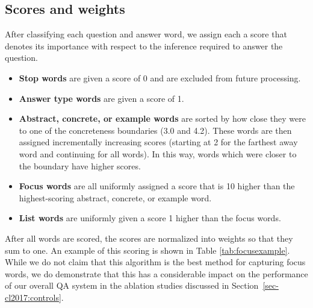 \subsection{Scores and weights}

After classifying each question and answer word, we assign each a score that denotes its importance with respect to the inference required to answer the question.  
\begin{itemize}

\item \textbf{Stop words} are given a score of 0 and are excluded from future processing.

\item \textbf{Answer type words} are given a score of 1. 

\item \textbf{Abstract, concrete, or example words} are sorted by how close they were to one of the concreteness boundaries (3.0 and 4.2).  These words are then assigned incrementally increasing scores (starting at 2 for the farthest away word and continuing for all words).  In this way, words which were closer to the boundary have higher scores.

\item \textbf{Focus words} are all uniformly assigned a score that is 10 higher than the highest-scoring abstract, concrete, or example word.  

\item \textbf{List words} are uniformly given a score 1 higher than the focus words.
  
\end{itemize}

After all words are scored, the scores are normalized into weights so that they sum to one.  An example of this scoring is shown in Table \ref{tab:focusexample}.  While we do not claim that this algorithm is the best method for capturing focus words, we do demonstrate that this has a considerable impact on the performance of our overall QA system in the ablation studies discussed in Section~\ref{sec-cl2017:controls}.

